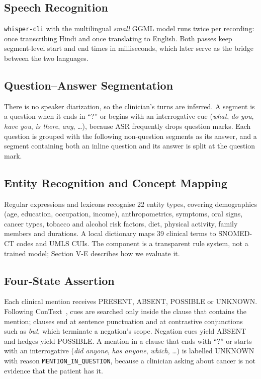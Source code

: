 \documentclass[conference]{IEEEtran}
\begin{document}
\subsection{Speech Recognition}
\texttt{whisper-cli} with the multilingual \emph{small} GGML model runs twice per recording: once transcribing Hindi and once translating to English. Both passes keep segment-level start and end times in milliseconds, which later serve as the bridge between the two languages.

\subsection{Question–Answer Segmentation}
There is no speaker diarization, so the clinician's turns are inferred. A segment is a question when it ends in “?” or begins with an interrogative cue (\emph{what}, \emph{do you}, \emph{have you}, \emph{is there}, \emph{any}, \ldots{}), because ASR frequently drops question marks. Each question is grouped with the following non-question segments as its answer, and a segment containing both an inline question and its answer is split at the question mark.

\subsection{Entity Recognition and Concept Mapping}
Regular expressions and lexicons recognise 22 entity types, covering demographics (age, education, occupation, income), anthropometrics, symptoms, oral signs, cancer types, tobacco and alcohol risk factors, diet, physical activity, family members and durations. A local dictionary maps 39 clinical terms to SNOMED-CT codes and UMLS CUIs. The component is a transparent rule system, not a trained model; Section V-E describes how we evaluate it.

\subsection{Four-State Assertion}
Each clinical mention receives PRESENT, ABSENT, POSSIBLE or UNKNOWN. Following ConText~\cite{context}, cues are searched only inside the clause that contains the mention; clauses end at sentence punctuation and at contrastive conjunctions such as \emph{but}, which terminate a negation's scope. Negation cues yield ABSENT and hedges yield POSSIBLE. A mention in a clause that ends with “?” or starts with an interrogative (\emph{did anyone}, \emph{has anyone}, \emph{which}, \ldots{}) is labelled UNKNOWN with reason \texttt{MENTION\_IN\_QUESTION}, because a clinician asking about cancer is not evidence that the patient has it.
\end{document}
